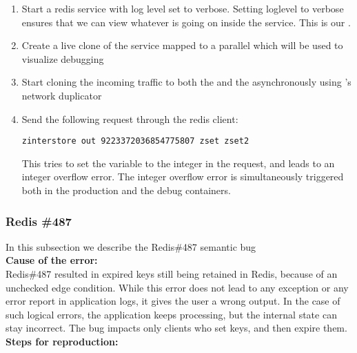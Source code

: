 \begin{adjustwidth}{0.5cm}{}
\begin{enumerate}
	\item Start a redis service with log level set to verbose. Setting loglevel to verbose ensures that we can view whatever is going on inside the service. This is our \productioncontainer.
	\item Create a live clone of the service mapped to a parallel \debugcontainer which will be used to visualize debugging
	\item Start cloning the incoming traffic to both the \productioncontainer and the \debugcontainer asynchronously using \parikshan's network duplicator
	\item Send the following request through the redis client: 
	
		\texttt{zinterstore out 9223372036854775807 zset zset2}
		
		This tries to set the variable to the integer in the request, and leads to an integer overflow error. The integer overflow error is simultaneously triggered both in the production and the debug containers.
	
\end{enumerate}
\end{adjustwidth}

\subsubsection{Redis \#487}

In this subsection we describe the Redis\#487 semantic bug \\

\noindent \textbf{Cause of the error:} \\

Redis\#487 resulted in expired keys still being retained in Redis, because of an unchecked edge condition.
While this error does not lead to any exception or any error report in application logs, it gives the user a wrong output.
In the case of such logical errors, the application keeps processing, but the internal state can stay incorrect.
The bug impacts only clients who set keys, and then expire them.\\

\noindent \textbf{Steps for reproduction:} \\

